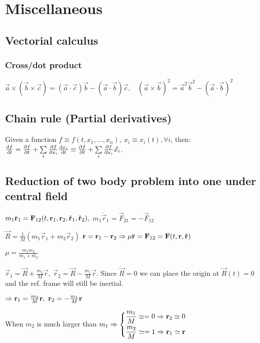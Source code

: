 \section{Miscellaneous}



\subsection{Vectorial calculus}
\subsubsection*{Cross/dot product}
$\vec{a}\times(\vec{b}\times\vec{c})=(\vec{a}\cdot\vec{c})\vec{b}-(\vec{a}\cdot\vec{b})\vec{c},\ \ \ \ (\vec{a}\times\vec{b})^{2}=\vec{a}^{2}\vec{b}^{2}-(\vec{a}\cdot\vec{b})^{2}$




\subsection{Chain rule (Partial derivatives)}
Given a function $f\equiv f(t,x_{1},...,x_{n}),\ x_{i}\equiv x_{i}(t),\forall i$, then:\\
$\dv{f}{t}=\pdv{f}{t}+\sum\limits_{i}\pdv{f}{x_{i}}\dv{x_{i}}{t}\equiv \pdv{f}{t}+\sum\limits_{i}\pdv{f}{x_{i}}\accentset{\mbox{\bfseries .}}{x_{i}}$.



\subsection{Reduction of two body problem into one under central field}
\begin{compactenum}
\item $m_{1}\ddot{\mathbf{r}}_{1}=\mathbf{F}_{12}(t,\mathbf{r}_{1},\mathbf{r}_{2},\accentset{\mbox{\bfseries .}}{\mathbf{r}}_{1},\accentset{\mbox{\bfseries .}}{\mathbf{r}}_{2}),$  $m_{1}\ddot{\vec{r}}_{1}=\vec{F}_{21}=-\vec{F}_{12}$
\item $\vec{R}=\frac{1}{M}(m_{1}\vec{r}_{1}+m_{2}\vec{r}_{2})$ $\mathbf{r}=\mathbf{r}_{1}-\mathbf{r}_{2}\Rightarrow \mu\ddot{\mathbf{r}}=\mathbf{F}_{12}=\mathbf{F}(t,\mathbf{r},\accentset{\mbox{\bfseries .}}{\mathbf{r}})$
\item $\mu=\frac{m_{1}m_{2}}{m_{1}+m_{2}}$
\item $\vec{r}_{1}=\vec{R}+\frac{m_{2}}{M}\vec{r},\ \vec{r}_{2}=\vec{R}-\frac{m_{1}}{M}\vec{r}$. Since $\ddot{\vec{R}}=0$ we can place the origin at $\vec{R}(t)=0$ and the ref. frame will still be inertial.
\item $\then \vec{r}_{1}=\frac{m_{2}}{M}\vec{r},\ \vec{r}_{2}=-\frac{m_{1}}{M}\vec{r}$
\item When $m_{2}$ is much larger than $m_{1}\Rightarrow\left\{ \begin{aligned} \frac{m_{1}}{M}\simeq=0\Rightarrow \mathbf{r}_{2}\simeq0 \\ \frac{m_{2}}{M}\simeq=1\Rightarrow \mathbf{r}_{1}\simeq\mathbf{r} \end{aligned} \right.$
\end{compactenum}



